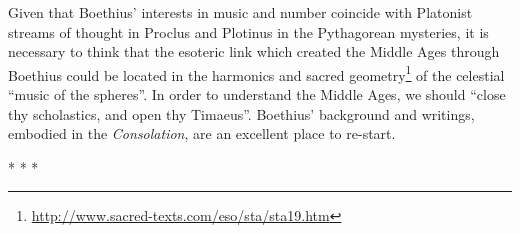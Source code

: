 Given that Boethius' interests in music and number coincide with Platonist streams of thought in Proclus and Plotinus in the Pythagorean mysteries, it is necessary to think that the esoteric link which created the Middle Ages through Boethius could be located in the harmonics and sacred geometry\footnote{\url{http://www.sacred-texts.com/eso/sta/sta19.htm}} of the celestial ``music of the spheres''. In order to understand the Middle Ages, we should ``close thy scholastics, and open thy Timaeus''. Boethius' background and writings, embodied in the \emph{Consolation}, are an excellent place to re-start.




\begin{center}* * *\end{center}

